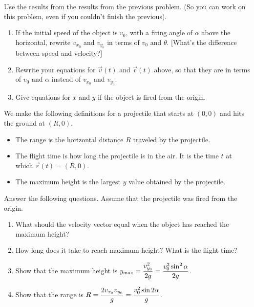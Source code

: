 \begin{problem}\label{projectile formulas from origin}
Use the results from the results from the previous problem. (So you can work on this problem, even if you couldn't finish the previous).
\begin{enumerate}
 \item If the initial speed of the object is $v_0$, with a firing angle of $\alpha$ above the horizontal, rewrite $v_{x_0}$ and $v_{y_0}$ in terms of $v_0$ and $\theta$. [What's the difference between speed and velocity?]
 \item Rewrite your equations for $\vec v(t)$ and $\vec r(t)$ above, so that they are in terms of $v_0$ and $\alpha$ instead of $v_{x_0}$ and $v_{y_0}$.
 \item Give equations for $x$ and $y$ if the object is fired from the origin. 
\end{enumerate}
\end{problem}
 
We make the following definitions for a projectile that starts at $(0,0)$ and hits the ground at $(R,0)$.
\begin{itemize}
 \item The range is the horizontal distance $R$ traveled by the projectile.  
 \item The flight time is how long the projectile is in the air. It is the time $t$ at which $\vec r(t)=(R,0)$.
 \item The maximum height is the largest $y$ value obtained by the projectile. 
\end{itemize}


\begin{problem}
 Answer the following questions. Assume that the projectile was fired from the origin.
\begin{enumerate}
 \item What should the velocity vector equal when the object has reached the maximum height?
 \item How long does it take to reach maximum height? What is the flight time?
 \item Show that the maximum height is $\displaystyle y_{\max}=\frac{v_{y_0}^2}{2g}=\frac{v_0^2\sin^2\alpha}{2g}$.
 \item Show that the range is $\displaystyle R=\frac{2v_{x_0}v_{y_0}}{g}=\frac{v_0^2\sin2\alpha}{g}$. 
\end{enumerate}
\end{problem}


